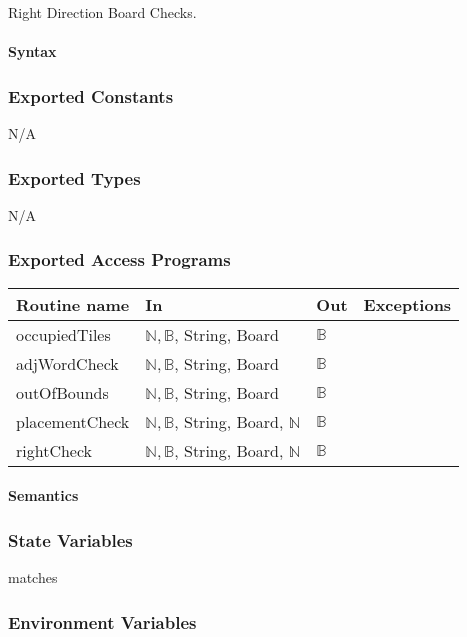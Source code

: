 \documentclass[12pt]{article}
\begin{document}
Right Direction Board Checks.

\paragraph*{Syntax}

\subsubsection*{Exported Constants}
N/A
\subsubsection*{Exported Types}

N/A

\subsubsection* {Exported Access Programs}

\begin{tabular}{| l | l | l | l |}
\hline
\textbf{Routine name} & \textbf{In} & \textbf{Out} & \textbf{Exceptions}\\
\hline
occupiedTiles & $\mathbb{N}, \mathbb{B}$, String, Board & $\mathbb{B}$ & \\
\hline
adjWordCheck & $\mathbb{N}, \mathbb{B}$, String, Board & $\mathbb{B}$ & \\
\hline
outOfBounds & $\mathbb{N}, \mathbb{B}$, String, Board & $\mathbb{B}$ & \\
\hline
placementCheck & $\mathbb{N}, \mathbb{B}$, String, Board, $\mathbb{N}$ & $\mathbb{B}$ & \\
\hline
rightCheck & $\mathbb{N}, \mathbb{B}$, String, Board, $\mathbb{N}$ & $\mathbb{B}$ & \\
\hline
\end{tabular}

\paragraph* {Semantics}

\subsubsection*{State Variables}

matches

\subsubsection*{Environment Variables}
\end{document}
